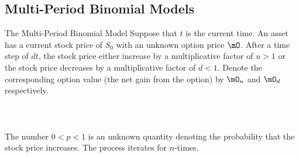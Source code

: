 \documentclass[a4paper]{article}
\begin{document}
\subsection{Multi-Period Binomial Models}
\begin{defn}{The Multi-Period Binomial Model}{} Suppose that $t$ is the current time. An asset has a current stock price of $S_0$ with an unknown option price $\mO$. After a time step of $dt$, the stock price either increase by a multiplicative factor of $u>1$ or the stock price decreases by a multiplicative factor of $d<1$. Denote the corresponding option value (the net gain from the option) by $\mO_u$ and $\mO_d$ respectively. \\~\\
 \\~\\
The number $0<p<1$ is an unknown quantity denoting the probability that the stock price increases. The process iterates for $n$-times. 
\end{defn}
\end{document}

